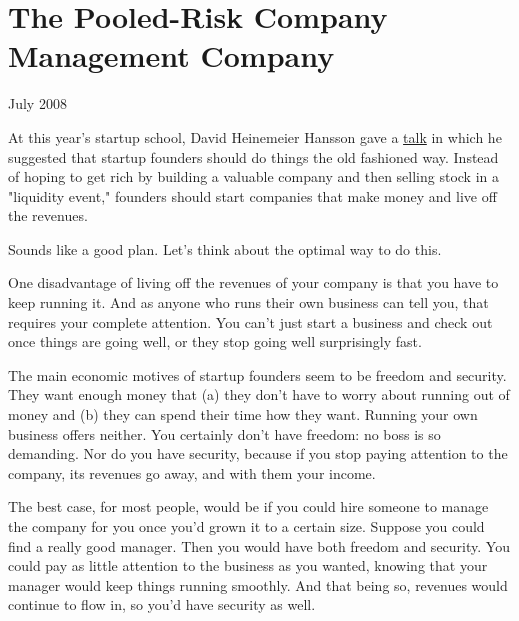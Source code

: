 \chapter{The Pooled-Risk Company Management Company}


            
              
                

July 2008

At this year's startup school, David
                  Heinemeier Hansson gave a
                  \href{http://www.omnisio.com/startupschool08/david-heinemeier-hansson-at-startup-school-08}{talk}
                  in which he suggested that startup founders should do things
                  the old fashioned way. Instead of hoping to get rich by
                  building a valuable company and then selling stock in a
                  "liquidity event," founders should start companies that make
                  money and live off the revenues.

Sounds like a good
                  plan. Let's think about the optimal way to do this.

One
                  disadvantage of living off the revenues of your company is
                  that you have to keep running it. And as anyone who runs their
                  own business can tell you, that requires your complete
                  attention. You can't just start a business and check out once
                  things are going well, or they stop going well surprisingly
                  fast.

The main economic motives of startup founders
                  seem to be freedom and security. They want enough money that
                  (a) they don't have to worry about running out of money and
                  (b) they can spend their time how they want. Running your own
                  business offers neither. You certainly don't have freedom: no
                  boss is so demanding. Nor do you have security, because if you
                  stop paying attention to the company, its revenues go away,
                  and with them your income.

The best case, for most
                  people, would be if you could hire someone to manage the
                  company for you once you'd grown it to a certain size. Suppose
                  you could find a really good manager. Then you would have both
                  freedom and security. You could pay as little attention to the
                  business as you wanted, knowing that your manager would keep
                  things running smoothly. And that being so, revenues would
                  continue to flow in, so you'd have security as well.

